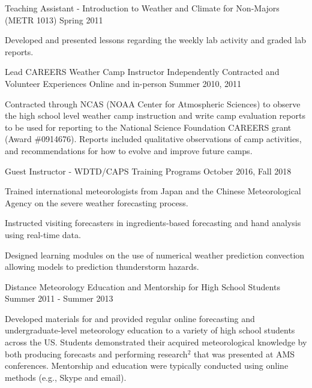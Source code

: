 \begin{cventries}
  \cventry
    {Teaching Assistant - Introduction to Weather and Climate for Non-Majors (METR 1013)} %
    {} %
    {} %
    {Spring 2011} %
    {
      \begin{cvitems} %
        \item {Developed and presented lessons regarding the weekly lab activity and graded lab reports.}
      \end{cvitems}
    }
    
  \cventry
    {Lead CAREERS Weather Camp Instructor} %
    {Independently Contracted and Volunteer Experiences} %
    {Online and in-person} %
    {Summer 2010, 2011} %
    {
      \begin{cvitems} %
        \item {Contracted through NCAS (NOAA Center for Atmospheric Sciences) to observe the high school level weather camp instruction and write camp evaluation reports to be used for reporting to the National Science Foundation CAREERS grant (Award \#0914676). Reports included qualitative observations of camp activities, and recommendations for how to evolve and improve future camps.}
      \end{cvitems}
    }    
  \cventry
    {Guest Instructor - WDTD/CAPS Training Programs} %
    {} %
    {} %
    {October 2016, Fall 2018} %
    {
      \begin{cvitems} %
        \item {Trained international meteorologists from Japan and the Chinese Meteorological Agency on the severe weather forecasting process.}
        \item {Instructed visiting forecasters in ingredients-based forecasting and hand analysis using real-time data.}
        \item {Designed learning modules on the use of numerical weather prediction convection allowing models to prediction thunderstorm hazards.}
      \end{cvitems}
    }    
    
  \cventry
    {Distance Meteorology Education and Mentorship for High School Students} %
    {} %
    {} %
    {Summer 2011 - Summer 2013} %
    {
      \begin{cvitems} %
        \item {Developed materials for and provided regular online forecasting and undergraduate-level meteorology education to a variety of high school students across the US.  Students demonstrated their acquired meteorological knowledge by both producing forecasts and performing research$^{2}$ that was presented at AMS conferences.  Mentorship and education were typically conducted using online methods (e.g., Skype and email).}
      \end{cvitems}
    }    
    

\end{cventries}
